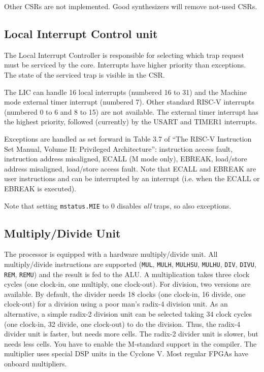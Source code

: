 \documentclass[12pt]{article}
\begin{document}
Other CSRs are not implemented. Good synthesizers will remove not-used CSRs.

\subsection{Local Interrupt Control unit}
The Local Interrupt Controller is responsible for selecting which trap request must be serviced by the core. Interrupts have higher priority than exceptions. The state of the serviced trap is visible in the CSR.

The LIC can handle 16 local interrupts (numbered 16 to 31) and the Machine mode external timer interrupt (numbered 7). Other standard RISC-V interrupts (numbered 0 to 6 and 8 to 15) are not available. The external timer interrupt has the highest priority, followed (currently) by the USART and TIMER1 interrupts.

Exceptions are handled as set forward in Table 3.7 of ``The RISC-V Instruction Set Manual, Volume II: Privileged Architecture'': instruction access fault, instruction address misaligned, ECALL (M mode only), EBREAK, load/store address misaligned, load/store access fault. Note that ECALL and EBREAK are user instructions and can be interrupted by an interrupt (i.e. when the ECALL or EBREAK is executed).

Note that setting \lstinline|mstatus.MIE| to 0 disables \emph{all} traps, so also exceptions.

\subsection{Multiply/Divide Unit}
The processor is equipped with a hardware multiply/divide unit. All multiply/divide instructions are supported (\texttt{MUL}, \texttt{MULH}, \texttt{MULHSU}, \texttt{MULHU}, \texttt{DIV}, \texttt{DIVU}, \texttt{REM}, \texttt{REMU}) and the result is fed to the ALU. A multiplication takes three clock cycles (one clock-in, one multiply, one clock-out). For division, two versions are available. By default, the divider needs 18 clocks (one clock-in, 16 divide, one clock-out) for a division using a poor man's radix-4 division unit. As an alternative, a simple radix-2 division unit can be selected taking 34 clock cycles (one clock-in, 32 divide, one clock-out) to do the division.  Thus, the radix-4 divider unit is faster, but needs more cells. The radix-2 divider unit is slower, but needs less cells. You have to enable the M-standard support in the compiler. The multiplier uses special DSP units in the Cyclone V. Most regular FPGAs have onboard multipliers.
\end{document}
